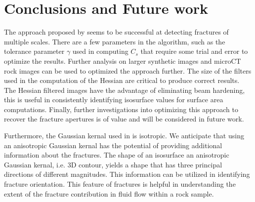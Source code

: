\documentclass{edger}
\begin{document}
\section{Conclusions and Future work}
The approach proposed by \cite{Voorn2013} seems to be successful at detecting fractures of multiple scales. There are a few parameters in the algorithm, such as the tolerance parameter $\gamma$ used in computing $C_s$ that require some trial and error to optimize the results. Further analysis on larger synthetic images and microCT rock images can be used to optimized the approach further. The size of the filters used in the computation of the Hessian are critical to produce correct results. The Hessian filtered images have the advantage of eliminating beam hardening, this is useful in consistently identifying isosurface values for surface area computations. Finally, further investigations into optimizing this approach to recover the fracture apertures is of value and will be considered in future work.

Furthermore, the Gaussian kernal used in \cite{Voorn2013} is isotropic. We anticipate that using an anisotropic Gaussian kernal has the potential of providing additional information about the fractures. The shape of an isosurface an anisotropic Gaussian kernal, i.e. 3D contour, yields a shape that has three principal directions of different magnitudes. This information can be utilized in identifying fracture orientation. This feature of fractures is helpful in understanding the extent of the fracture contribution in fluid flow within a rock sample. 

\clearpage
\newpage

\end{document}
